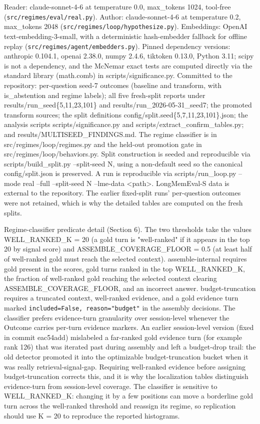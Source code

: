 Reader: claude-sonnet-4-6 at temperature 0.0, max\_tokens 1024, tool-free (\texttt{src/regimes/eval/real.py}). Author: claude-sonnet-4-6 at temperature 0.2, max\_tokens 2048 (\texttt{src/regimes/loop/hypothesize.py}). Embeddings: OpenAI text-embedding-3-small, with a deterministic hash-embedder fallback for offline replay (\texttt{src/regimes/agent/embedders.py}). Pinned dependency versions: anthropic 0.104.1, openai 2.38.0, numpy 2.4.6, tiktoken 0.13.0, Python 3.11; scipy is not a dependency, and the McNemar exact tests are computed directly via the standard library (math.comb) in scripts/significance.py. Committed to the repository: per-question seed-7 outcomes (baseline and transform, with is\_abstention and regime labels); all five fresh-split reports under results/run\_seed\{5,11,23,101\} and results/run\_2026-05-31\_seed7; the promoted transform sources; the split definitions config/split.seed\{5,7,11,23,101\}.json; the analysis scripts scripts/significance.py and scripts/extract\_confirm\_tables.py; and results/MULTISEED\_FINDINGS.md. The regime classifier is in src/regimes/loop/regimes.py and the held-out promotion gate in src/regimes/loop/behaviors.py. Split construction is seeded and reproducible via scripts/build\_split.py --split-seed N, using a non-default seed so the canonical config/split.json is preserved. A run is reproducible via scripts/run\_loop.py --mode real --full --split-seed N --lme-data <path>. LongMemEval-S data is external to the repository. The earlier fixed-split runs' per-question outcomes were not retained, which is why the detailed tables are computed on the fresh splits.

Regime-classifier predicate detail (Section 6). The two thresholds take the values WELL\_RANKED\_K = 20 (a gold turn is "well-ranked" if it appears in the top 20 by signal score) and ASSEMBLE\_COVERAGE\_FLOOR = 0.5 (at least half of well-ranked gold must reach the selected context). assemble-internal requires gold present in the scores, gold turns ranked in the top WELL\_RANKED\_K, the fraction of well-ranked gold reaching the selected context clearing ASSEMBLE\_COVERAGE\_FLOOR, and an incorrect answer. budget-truncation requires a truncated context, well-ranked evidence, and a gold evidence turn marked \texttt{included=False, reason="budget"} in the assembly decisions. The classifier prefers evidence-turn granularity over session-level whenever the Outcome carries per-turn evidence markers. An earlier session-level version (fixed in commit eac54add) mislabeled a far-ranked gold evidence turn (for example rank 126) that was iterated past during assembly and left a budget-drop trail: the old detector promoted it into the optimizable budget-truncation bucket when it was really retrieval-signal-gap. Requiring well-ranked evidence before assigning budget-truncation corrects this, and it is why the localization tables distinguish evidence-turn from session-level coverage. The classifier is sensitive to WELL\_RANKED\_K: changing it by a few positions can move a borderline gold turn across the well-ranked threshold and reassign its regime, so replication should use K = 20 to reproduce the reported histograms.


